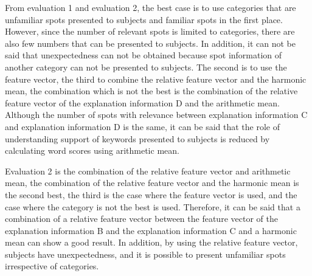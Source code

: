 \documentclass[journal]{IAENGtran}
\begin{document}
From evaluation 1 and evaluation 2, the best case is to use categories that are unfamiliar spots presented to subjects and familiar spots in the first place.
However, since the number of relevant spots is limited to categories, there are also few numbers that can be presented to subjects.
In addition, it can not be said that unexpectedness can not be obtained because spot information of another category can not be presented to subjects.
The second is to use the feature vector, the third to combine the relative feature vector and the harmonic mean, the combination which is not the best is the combination of the relative feature vector of the explanation information D and the arithmetic mean.
Although the number of spots with relevance between explanation information C and explanation information D is the same, it can be said that the role of understanding support of keywords presented to subjects is reduced by calculating word scores using arithmetic mean.

Evaluation 2 is the combination of the relative feature vector and arithmetic mean, the combination of the relative feature vector and the harmonic mean is the second best, the third is the case where the feature vector is used, and the case where the category is not the best is used.
Therefore, it can be said that a combination of a relative feature vector between the feature vector of the explanation information B and the explanation information C and a harmonic mean can show a good result.
In addition, by using the relative feature vector, subjects have unexpectedness, and it is possible to present unfamiliar spots irrespective of categories.
\end{document}
